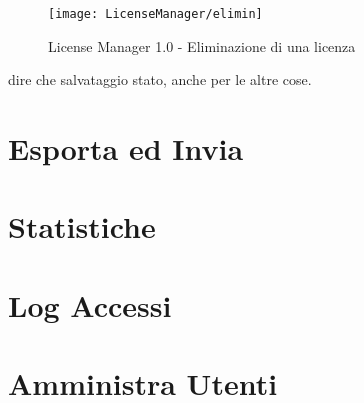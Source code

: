 \begin{figure}[!h] 
    \centering 
    \texttt{[image: LicenseManager/elimin]} 
    \caption{License Manager 1.0 - Eliminazione di una licenza}
\label{sblocca}
\end{figure}

dire che salvataggio stato, anche per le altre cose.



\section{Esporta ed Invia}

\section{Statistiche}


\section{Log Accessi}


\section{Amministra Utenti}

